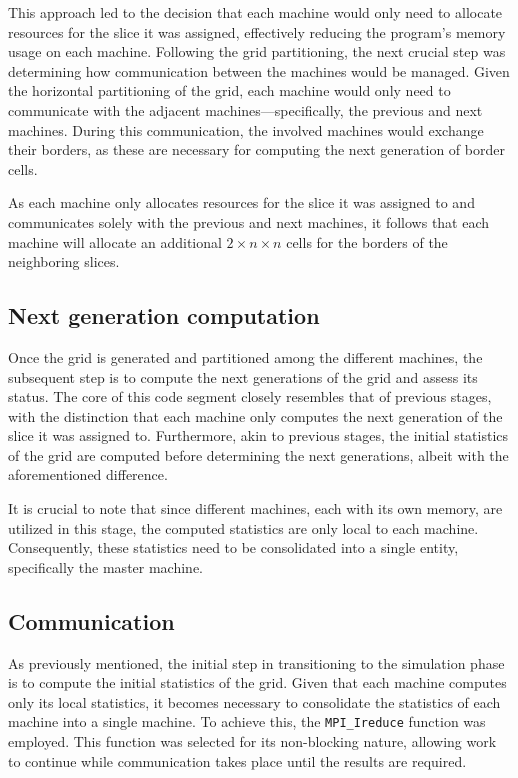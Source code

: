 \documentclass{article}
\begin{document}
This approach led to the decision that each machine would only need to allocate resources for the 
slice it was assigned, effectively reducing the program's memory usage on each machine. Following 
the grid partitioning, the next crucial step was determining how communication between the machines 
would be managed. Given the horizontal partitioning of the grid, each machine would only need to 
communicate with the adjacent machines—specifically, the previous and next machines. During this 
communication, the involved machines would exchange their borders, as these are necessary for 
computing the next generation of border cells.


As each machine only allocates resources for the slice it was assigned to and communicates solely 
with the previous and next machines, it follows that each machine will allocate an additional 
$2 \times n \times n$ cells for the borders of the neighboring slices.

\subsection{Next generation computation}

Once the grid is generated and partitioned among the different machines, the subsequent step is to compute 
the next generations of the grid and assess its status. The core of this code segment closely resembles 
that of previous stages, with the distinction that each machine only computes the next generation 
of the slice it was assigned to. Furthermore, akin to previous stages, the initial statistics of the grid 
are computed before determining the next generations, albeit with the aforementioned difference.

It is crucial to note that since different machines, each with its own memory, are utilized in this stage, 
the computed statistics are only local to each machine. Consequently, these statistics need to be 
consolidated into a single entity, specifically the master machine.

\subsection{Communication}
As previously mentioned, the initial step in transitioning to the simulation phase is to compute the initial 
statistics of the grid. Given that each machine computes only its local statistics, it becomes necessary to 
consolidate the statistics of each machine into a single machine. To achieve this, the \texttt{MPI\_Ireduce} function
was employed. This function was selected for its non-blocking nature, allowing work to continue while communication 
takes place until the results are required.
\end{document}
